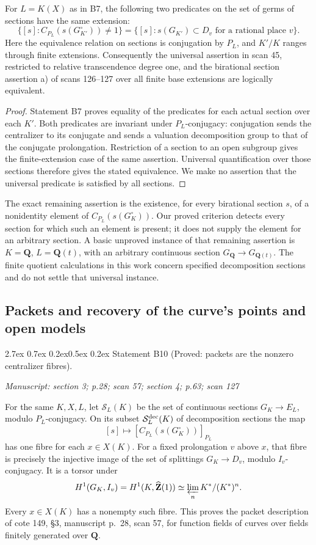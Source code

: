 \documentclass[11pt,a4paper]{article}
\makeatletter
\newcommand{\passage}[1]{\par\smallskip\noindent\textit{Manuscript: #1}\par\smallskip}
\renewcommand\paragraph{\@startsection{paragraph}{4}{\z@}%
  {2.7ex \@plus 0.7ex \@minus 0.2ex}{0.5ex \@plus 0.2ex}%
  {\normalfont\normalsize\bfseries}}
\makeatother
\begin{document}
For $L=K(X)$ as in B7, the following two predicates on the set of germs
of sections have the same extension:
\[
 \{[s]:C_{P_L}(s(G_{K'}^\circ))\ne1\}
 =
 \{[s]:s(G_{K'})\subset D_v\text{ for a rational place }v\}.
\]
Here the equivalence relation on sections is conjugation by $P_L$, and
$K'/K$ ranges through finite extensions. Consequently the universal
assertion in scan 45, restricted to relative transcendence degree one,
and the birational section assertion a) of scans 126--127 over all finite
base extensions are logically equivalent.

\begin{proof}
Statement B7 proves equality of the predicates for each actual section
over each $K'$. Both predicates are invariant under $P_L$-conjugacy:
conjugation sends the centralizer to its conjugate and sends a valuation
decomposition group to that of the conjugate prolongation. Restriction
of a section to an open subgroup gives the finite-extension case of the
same assertion. Universal quantification over those sections therefore
gives the stated equivalence. We make no assertion that the universal
predicate is satisfied by all sections.
\end{proof}

The exact remaining assertion is the existence, for every birational
section $s$, of a nonidentity element of
$C_{P_L}(s(G_K^\circ))$. Our proved criterion detects every section for
which such an element is present; it does not supply the element for an
arbitrary section. A basic unproved instance of that remaining assertion
is $K=\mathbf Q$, $L=\mathbf Q(t)$, with an arbitrary continuous section
$G_{\mathbf Q}\to G_{\mathbf Q(t)}$. The finite quotient calculations
in this work concern specified decomposition sections and do not settle
that universal instance.

\subsection{Packets and recovery of the curve's points and open models}

\paragraph{Statement B10 (Proved: packets are the nonzero centralizer fibres).}\label{res:B10}
\passage{section 3; p.28; scan 57; section 4; p.63; scan 127}

For the same $K,X,L$, let $\mathcal S_L(K)$ be the set of continuous
sections $G_K\to E_L$, modulo $P_L$-conjugacy. On its subset
$\mathcal S_L^{\rm dec}(K)$ of decomposition sections the map
\[
 [s]\longmapsto[C_{P_L}(s(G_K^\circ))]_{P_L}
\]
has one fibre for each $x\in X(K)$. For a fixed prolongation $v$ above
$x$, that fibre is precisely the injective image of the set of splittings
$G_K\to D_v$, modulo $I_v$-conjugacy. It is a torsor under
\[
 H^1(G_K,I_v)=H^1(K,\widehat{\mathbf Z}(1))
 \simeq\varprojlim_n K^*/(K^*)^n.
\]
Every $x\in X(K)$ has a nonempty such fibre. This proves the packet
description of cote 149, \S3, manuscript p.~28, scan 57, for function
fields of curves over fields finitely generated over $\mathbf Q$.
\end{document}
